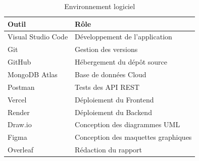 \begin{table}[H]
\centering
\renewcommand{\arraystretch}{1.3}

\begin{tabular}{|l|p{8cm}|}

\hline

\textbf{Outil} & \textbf{Rôle}

\\

\hline

Visual Studio Code &
Développement de l'application

\\

\hline

Git &
Gestion des versions

\\

\hline

GitHub &
Hébergement du dépôt source

\\

\hline

MongoDB Atlas &
Base de données Cloud

\\

\hline

Postman &
Tests des API REST

\\

\hline

Vercel &
Déploiement du Frontend

\\

\hline

Render &
Déploiement du Backend

\\

\hline

Draw.io &
Conception des diagrammes UML

\\

\hline

Figma &
Conception des maquettes graphiques

\\

\hline

Overleaf &
Rédaction du rapport

\\

\hline

\end{tabular}

\caption{Environnement logiciel}

\label{tab:logiciel}

\end{table}

